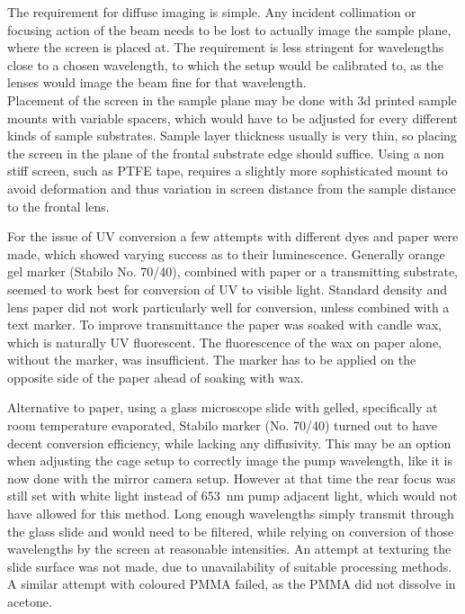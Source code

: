 \documentclass[twoside,openright,listof=numbered]{scrreprt}
\begin{document}
The requirement for diffuse imaging is simple. Any incident collimation or focusing action of the beam needs to be lost to actually image the sample plane, where the screen is placed at. The requirement is less stringent for wavelengths close to a chosen wavelength, to which the setup would be calibrated to, as the lenses would image the beam fine for that wavelength.\\

Placement of the screen in the sample plane may be done with 3d printed sample mounts with variable spacers, which would have to be adjusted for every different kinds of sample substrates. Sample layer thickness usually is very thin, so placing the screen in the plane of the frontal substrate edge should suffice. Using a non stiff screen, such as PTFE tape, requires a slightly more sophisticated mount to avoid deformation and thus variation in screen distance from the sample distance to the frontal lens. 

For the issue of UV conversion a few attempts with different dyes and paper were made, which showed varying success as to their luminescence. Generally orange gel marker (Stabilo No. 70/40), combined with paper or a transmitting substrate, seemed to work best for conversion of UV to visible light.
Standard density and lens paper did not work particularly well for conversion, unless combined with a text marker. To improve transmittance the paper was soaked with candle wax, which is naturally UV fluorescent. The fluorescence of the wax on paper alone, without the marker, was insufficient. The marker has to be applied on the opposite side of the paper ahead of soaking with wax. 

Alternative to paper, using a glass microscope slide with gelled, specifically at room temperature evaporated, Stabilo marker (No. 70/40) turned out to have decent conversion efficiency, while lacking any diffusivity.  This may be an option when adjusting the cage setup to correctly image the pump wavelength, like it is now done with the mirror camera setup. However at that time the rear focus was still set with white light instead of \qty{653}{\nano\meter} pump adjacent light, which would not have allowed for this method. Long enough wavelengths simply transmit through the glass slide and would need to be filtered, while relying on conversion of those wavelengths by the screen at reasonable intensities. An attempt at texturing the slide surface was not made, due to unavailability of suitable processing methods. A similar attempt with coloured PMMA failed, as the PMMA did not dissolve in acetone.\\
\end{document}
